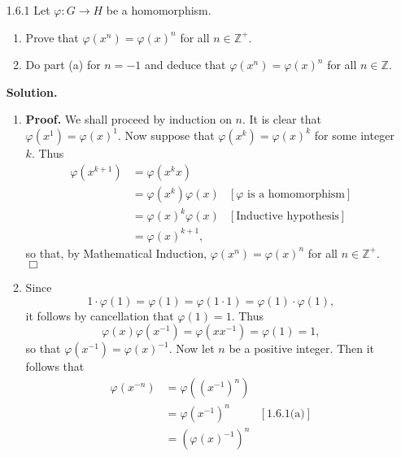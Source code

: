 \documentclass[9pt]{article}
\newcommand{\qed}{\hfill \ensuremath{\Box}}
\newcommand{\Z}{\mathbb{Z}}
\begin{document}
\begin{enumerate}
   \item[1.6.1]   Let $\varphi : G \rightarrow H$ be a homomorphism.
                  \begin{enumerate}
                     \item Prove that $\varphi(x^n) = \varphi(x)^n$ for all
                           $n \in \Z^+$.
                     \item Do part (a) for $n = -1$ and deduce that
                           $\varphi(x^n) = \varphi(x)^n$ for all $n \in \Z$.
                  \end{enumerate}

      \textbf{Solution.}

      \begin{enumerate}
         \item \textbf{Proof.} We shall proceed by induction on $n$. It is clear
               that $\varphi(x^1) = \varphi(x)^1$. Now suppose that
               $\varphi(x^k) = \varphi(x)^k$ for some integer $k$. Thus
               \begin{align*}
                  \varphi(x^{k+1}) &= \varphi(x^kx) \\
                     &= \varphi(x^k)\varphi(x)
                        &[\varphi\text{ is a homomorphism}] \\
                     &= \varphi(x)^k\varphi(x) &[\text{Inductive hypothesis}] \\
                     &= \varphi(x)^{k+1},
               \end{align*}
               so that, by Mathematical Induction, $\varphi(x^n) = \varphi(x)^n$ 
               for all $n \in \Z^+$. \qed
         \item Since
               $$1 \cdot \varphi(1) = \varphi(1) = \varphi(1 \cdot 1) =
                 \varphi(1)\cdot\varphi(1),$$
               it follows by cancellation that $\varphi(1) = 1$. Thus
               $$\varphi(x)\varphi(x^{-1}) = \varphi(xx^{-1}) =\varphi(1) = 1,$$
               so that $\varphi(x^{-1}) = \varphi(x)^{-1}$. Now let $n$ be a
               positive integer. Then it follows that
               \begin{align*}
                  \varphi(x^{-n}) &= \varphi((x^{-1})^n) \\
                     &= \varphi(x^{-1})^n &[\text{1.6.1(a)}] \\
                     &= (\varphi(x)^{-1})^n \\

\end{align*}
\end{enumerate}
\end{enumerate}
\end{document}
